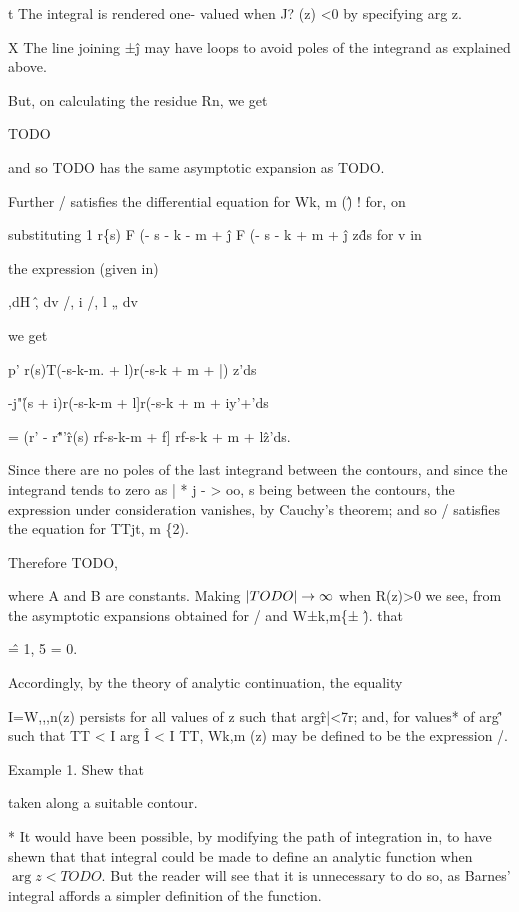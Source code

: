 t The integral is rendered one- valued when J? (z) <0 by specifying
arg z.

X The line joining ±\^j may have loops to avoid poles of the integrand
as explained above.

%
%
But, on calculating the residue Rn, we get

TODO

and so TODO has the same asymptotic expansion as TODO.

Further / satisfies the differential equation for Wk, m (\^) ! for, on

substituting 1 r\{s) F (- s - k - m + \^j F (- s - k + m + \^j z\^ds
for v in

the expression (given in)

,dH \^, dv /, i /, l „ dv

we get

p' r(s)T(-s-k-m. + l)r(-s-k + m + |) z'ds

-j"\r(s + i)r(-s-k-m + l]r(-s-k + m + iy'+'ds

= (r' - r\^"'\^ r(s) rf-s-k-m + f] rf-s-k + m + l\^z'ds.

Since there are no poles of the last integrand between the contours,
and since the integrand tends to zero as | * j - > oo, s being
between the contours, the expression under consideration vanishes, by
Cauchy's theorem; and so / satisfies the equation for TTjt, m \{2).

Therefore TODO,

where A and B are constants. Making $\left| TODO \right| \rightarrow \infty$
when R(z)>0 we see, from the asymptotic expansions obtained for / and
W±k,m\{± \^). that

\^ = 1, 5 = 0.

Accordingly, by the theory of analytic continuation, the equality

I=W,,,n(z) persists for all values of z such that arg\^r|<7r; and, for
values* of arg\^' such that TT < I arg \^ I < I TT, Wk,m (z) may be
defined to be the expression /.

Example 1. Shew that

taken along a suitable contour.

* It would have been possible, by modifying the path of integration in, to have shewn that that integral could be made to define an
analytic function when $\arg z < TODO$. But the reader will see that
it is unnecessary to do so, as Barnes' integral affords a simpler
definition of the function.

